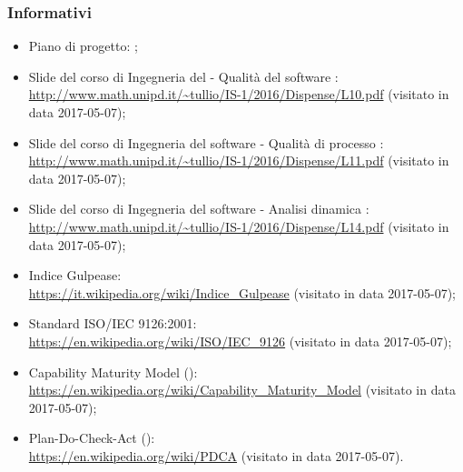\documentclass[PdQ.tex]{subfiles}
\begin{document}
		\subsubsection{Informativi}
			\begin{itemize}
				\item Piano di progetto: \PPdoc{};
				\item Slide del corso di Ingegneria del  - Qualità del software : \\
				\url{http://www.math.unipd.it/~tullio/IS-1/2016/Dispense/L10.pdf} (visitato in data 2017-05-07);
				\item Slide del corso di Ingegneria del software - Qualità di processo : \\
				\url{http://www.math.unipd.it/~tullio/IS-1/2016/Dispense/L11.pdf} (visitato in data 2017-05-07);
				\item Slide del corso di Ingegneria del software - Analisi dinamica : \\
				\url{http://www.math.unipd.it/~tullio/IS-1/2016/Dispense/L14.pdf} (visitato in data 2017-05-07);
				\item Indice Gulpease: \\
				\url{https://it.wikipedia.org/wiki/Indice_Gulpease} (visitato in data 2017-05-07);
				\item Standard ISO/IEC 9126:2001: \\
				\url{https://en.wikipedia.org/wiki/ISO/IEC_9126} (visitato in data 2017-05-07);
				\item Capability Maturity Model (): \\
				\url{https://en.wikipedia.org/wiki/Capability_Maturity_Model} (visitato in data 2017-05-07);
				\item Plan-Do-Check-Act (): \\
				\url{https://en.wikipedia.org/wiki/PDCA} (visitato in data 2017-05-07).
			\end{itemize}
			
\end{document}
